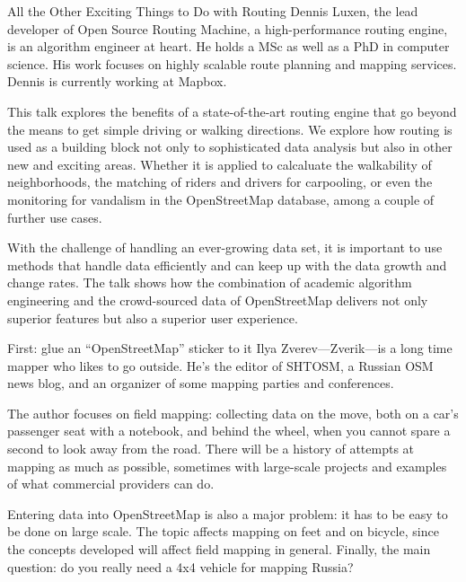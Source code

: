 %
{All the Other Exciting Things to Do with Routing}%
{Dennis Luxen, the lead developer of Open Source Routing Machine, a high-performance routing engine, is an algorithm engineer at heart. He holds a MSc as well as a PhD in computer science. His work focuses on highly scalable route planning and mapping services. Dennis is currently working at Mapbox. }%
{This talk explores the benefits of a state-of-the-art routing engine that go beyond the means to get simple driving or walking directions. We explore how 
routing is used as a building block not only to sophisticated data analysis but also in other new and exciting areas. Whether it is applied to calcaluate the walkability of neighborhoods, the matching of riders and drivers for carpooling, or even the monitoring for vandalism in the OpenStreetMap database, 
among a couple of further use cases. 

With the challenge of handling an ever-growing data set, it is important to use methods that handle data efficiently and can keep up with the data growth and change rates. The talk shows how the combination of academic algorithm engineering and the crowd-sourced data 
of OpenStreetMap delivers not only superior features but also a superior user experience.}

%
{First: glue an ``OpenStreetMap'' sticker to it}%
{Ilya Zverev---Zverik---is a long time mapper who likes to go outside. He's the editor of SHTOSM, a Russian OSM news blog, and an organizer of some mapping parties and conferences. }%
{The author focuses on field mapping: collecting data on the move, both on a car's passenger seat with a notebook, and behind the wheel, when you cannot spare a second to look away from the road. There will be a history of attempts at mapping as much as possible, sometimes with large-scale projects and examples of what commercial providers can do. 

Entering data into OpenStreetMap is also a major problem: it has to be easy to be done on large scale. The topic affects mapping on feet and on bicycle, since the concepts developed will affect field mapping in general. Finally, the main question: do you really need a 4x4 vehicle for mapping Russia?}

